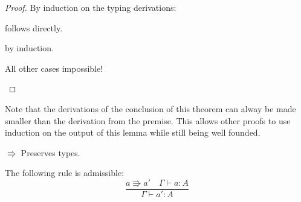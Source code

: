 \begin{proof}
By induction on the typing derivations:
\begin{casenv}
 \item {} follows directly.
 \item {} by induction.
 \item All other cases impossible!
\end{casenv}
\end{proof}
 
Note that the derivations of the conclusion of this theorem can alway be made smaller than the derivation from the premise.
This allows other proofs to use induction on the output of this lemma while still being well founded.
 
\begin{thm} $\Rrightarrow$ Preserves types.
 
The following rule is admissible:
\[
\frac{a\Rrightarrow a'\quad \Gamma \vdash a:A}{\Gamma \vdash a':A}
\]
\end{thm}
 
